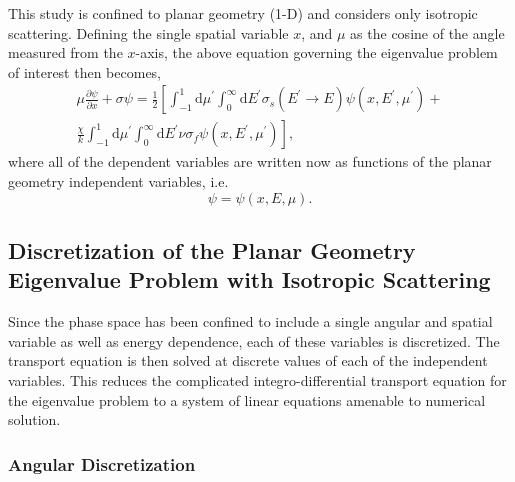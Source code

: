 \noindent This study is confined to planar geometry (1-D) and considers only
	isotropic scattering.  Defining the single spatial variable ${x}$, and ${\mu}$ as the 
	cosine of the angle measured from the ${x}$-axis, the above equation governing the
	eigenvalue problem of interest then becomes,
\begin{multline}
	\mu\frac{\partial{\psi}}{\partial{x}}+\sigma{\psi} = \frac{1}{2} \left[ \int_{-1}^{1}\mathrm
		{d}{\mu}^{'} \int_{0}^{\infty}\mathrm{d}{E}^{'}\sigma_{s}({E}^{'}\rightarrow{E})
		\psi({x},{E}^{'},{\mu}^{'}) \right. + \\
		\left. \frac{\chi}{k}\int_{-1}^{1}\mathrm{d}{\mu}^{'}\int_{0}^{\infty}\mathrm{d}{E}^{'}
		\nu{\sigma_f}{\psi}({x},{E}^{'},{\mu}^{'})\right ],
		\label{eq:plnr_crit}
\end{multline}
\noindent where all of the dependent variables are written now as functions of the planar geometry
	independent variables, i.e.
\begin{equation}
	\psi = \psi({x},{E},{\mu}).
\end{equation}

\belowSubSecSkip

\subsection{Discretization of the Planar Geometry Eigenvalue Problem with Isotropic Scattering}
\label{sec:Transport-Discret}

\noindent
	\indent Since the phase space has been confined to include a single angular and spatial
	variable as well as energy dependence, each of these variables is discretized.  The transport
	equation is then solved at discrete values of each of the independent variables.  This reduces the
	complicated integro-differential transport equation for the eigenvalue problem to a system of linear
	equations amenable to numerical solution.
	
\subsubsection{Angular Discretization}
\label{sec:Transport-Discret-Ang}

